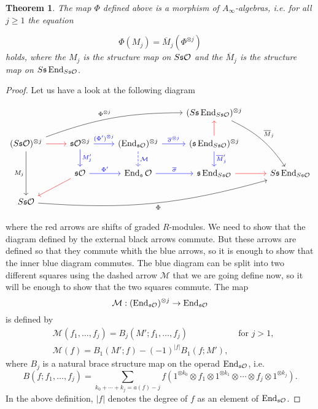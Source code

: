 \documentclass[twoside]{article}
\newtheorem{thm}[defin]{Theorem}
\begin{document}
\begin{thm}
The map $\Phi$ defined above is a morphism of $A_\infty$-algebras, i.e. for all $j\geq 1$ the equation

\[\Phi(M_j)=\overline{M}_j(\Phi^{\otimes j})\]
holds, where the $M_j$ is the structure map on $S\mathfrak{s}{\mathcal O}$ and the $\overline{M}_j$ is the structure map on $S\mathfrak{s}\operatorname{End}_{S\mathfrak{s}{\mathcal O}}$.
\end{thm}
\begin{proof}
Let us have a look at the following diagram

\[
\begin{tikzcd}
 & & &(S\s\End_{S\s\OO})^{\otimes j}\arrow[ddr, bend left=15, "\overline{M}_j"]&\\
(S\s\OO)^{\otimes j}\arrow[r,red] \arrow[dd, "M_j"']\arrow[urrr,bend left=10, "\Phi^{\otimes j}"]&\s\OO^{\otimes j}\arrow[r,blue, "(\Phi')^{\otimes j}"]\arrow[d, blue, "M'_j"] & (\End_{\s\OO})^{\otimes j}\arrow[r, blue,"\overline{\sigma}^{\otimes j}"] \arrow[d, dashed, "\mathcal{M}",blue]& (\s\End_{S\s\OO})^{\otimes j}\arrow[u,red]\arrow[d, "\overline{M}'_j",blue]& \\
&\s\OO\arrow[dl,red]\arrow[r, blue, "\Phi'"]& \End_\s\OO \arrow[r, blue, "\overline{\sigma}"] & \s\End_{S\s\OO}\arrow[r,red]& S\s\End_{S\s\OO}\\
S\s\OO\arrow[urrrr, bend right=10, "\Phi"']& &
\end{tikzcd}
\]

where the red arrows are shifts of graded $R$-modules. We need to show that the diagram defined by the external black arrows commute. But these arrows are defined so that they commute whith the blue arrows, so it is enough to show that the inner blue diagram commutes. The blue diagram can be split into two different squares using the dashed arrow $\mathcal{M}$ that we are going define now, so it will be enough to show that the two squares commute. The map 
\[\mathcal{M}:(\operatorname{End}_{\mathfrak{s}{\mathcal O}})^{\otimes j}\to\operatorname{End}_{\mathfrak{s}{\mathcal O}}\]
is defined by 
\begin{align*}
&\mathcal{M}(f_1, \dots, f_j)=B_j(M';f_1,\dots, f_j) &\text{ for }j>1,\\
&\mathcal{M}(f)=B_1(M';f)-(-1)^{|f|}B_1(f;M'),
\end{align*}
 where $B_j$ is a natural brace structure map on the operad $\operatorname{End}_{\mathfrak{s}{\mathcal O}}$, i.e. 
\[B(f;f_1,\dots, f_j)=\sum_{k_0+\cdots+k_j=a(f)-j} f(1^{\otimes k_0}\otimes f_1\otimes 1^{\otimes k_1}\otimes\cdots\otimes f_j\otimes 1^{\otimes k_j}).\]
 In the above definition, $|f|$ denotes the degree of $f$ as an element of $\operatorname{End}_{\mathfrak{s}{\mathcal O}}$. %
 

\end{proof}
\end{document}
